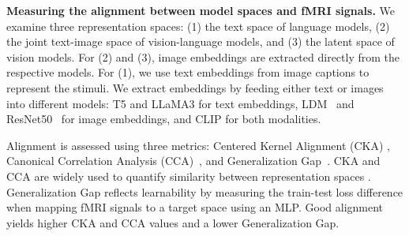 \textbf{Measuring the alignment between model spaces and fMRI signals.}
We examine three representation spaces: (1) the text space of language models, (2) the joint text-image space of vision-language models, and (3) the latent space of vision models. For (2) and (3), image embeddings are extracted directly from the respective models. For (1), we use text embeddings from image captions to represent the stimuli. We extract embeddings by feeding either text or images into different models: T5 and LLaMA3
for text embeddings, 
LDM~\citep{rombach2022high} and ResNet50~\citep{he2016deep} for image embeddings, and CLIP for both modalities. 


Alignment is assessed using three metrics: Centered Kernel Alignment (CKA) \citep{murphy2024correcting}, Canonical Correlation Analysis (CCA)~\citep{wang2020finding}, and Generalization Gap~\citep{keskar2016large}. CKA and CCA are widely used to quantify similarity between representation spaces \citep{kriegeskorte2008representational, wang2020finding}. Generalization Gap reflects learnability by measuring the train-test loss difference when mapping fMRI signals to a target space using an MLP. Good alignment yields higher CKA and CCA values and a lower Generalization Gap.


